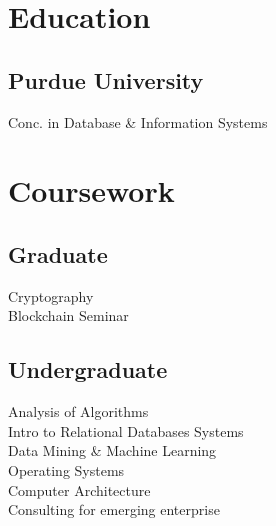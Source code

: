 \documentclass[]{resume_openfont}
\begin{document}
%
%



%
%

\begin{minipage}[t]{0.33\textwidth} 


\section{Education} 

\subsection{Purdue University}
Conc. in Database \& Information Systems
\sectionsep


\sectionsep


\section{Coursework}
\subsection{Graduate}
Cryptography \\
Blockchain Seminar \\
\sectionsep



\subsection{Undergraduate}
Analysis of Algorithms \\
Intro to Relational Databases Systems \\
Data Mining \& Machine Learning \\
Operating Systems \\
Computer Architecture \\
Consulting for emerging enterprise \\
\sectionsep


\end{minipage}
\end{document}

